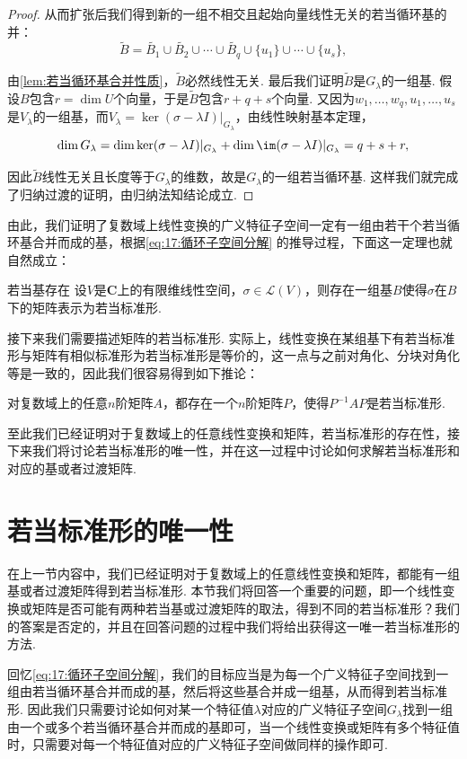 \begin{proof}
    从而扩张后我们得到新的一组不相交且起始向量线性无关的若当循环基的并：
    \[\tilde{B}=\tilde{B_1}\cup\tilde{B_2}\cup\cdots\cup\tilde{B_q}\cup\{u_1\}\cup\cdots\cup\{u_s\},\]

    由\autoref{lem:若当循环基合并性质}，$\tilde{B}$必然线性无关. 最后我们证明$\tilde{B}$是$G_\lambda$的一组基. 假设$B$包含$r=\dim U$个向量，于是$\tilde{B}$包含$r+q+s$个向量. 又因为$w_1,\ldots,w_q,u_1,\ldots,u_s$是$V_\lambda$的一组基，而$V_\lambda=\ker(\sigma-\lambda I)\vert_{G_\lambda}$，由线性映射基本定理，
    \[\dim G_\lambda=\dim\ker(\sigma-\lambda I)\vert_{G_\lambda}+\dim\im(\sigma-\lambda I)\vert_{G_\lambda}=q+s+r,\]

    因此$\tilde{B}$线性无关且长度等于$G_\lambda$的维数，故是$G_\lambda$的一组若当循环基. 这样我们就完成了归纳过渡的证明，由归纳法知结论成立.
\end{proof}

由此，我们证明了复数域上线性变换的广义特征子空间一定有一组由若干个若当循环基合并而成的基，根据\autoref{eq:17:循环子空间分解} 的推导过程，下面这一定理也就自然成立：
\begin{corollary}{}{若当基存在}
    设$V$是$\mathbf{C}$上的有限维线性空间，$\sigma\in\mathcal{L}(V)$，则存在一组基$B$使得$\sigma$在$B$下的矩阵表示为若当标准形.
\end{corollary}

接下来我们需要描述矩阵的若当标准形. 实际上，线性变换在某组基下有若当标准形与矩阵有相似标准形为若当标准形是等价的，这一点与之前对角化、分块对角化等是一致的，因此我们很容易得到如下推论：
\begin{corollary}{}{}
    对复数域上的任意$n$阶矩阵$A$，都存在一个$n$阶矩阵$P$，使得$P^{-1}AP$是若当标准形.
\end{corollary}

至此我们已经证明对于复数域上的任意线性变换和矩阵，若当标准形的存在性，接下来我们将讨论若当标准形的唯一性，并在这一过程中讨论如何求解若当标准形和对应的基或者过渡矩阵.

\section{若当标准形的唯一性}

在上一节内容中，我们已经证明对于复数域上的任意线性变换和矩阵，都能有一组基或者过渡矩阵得到若当标准形. 本节我们将回答一个重要的问题，即一个线性变换或矩阵是否可能有两种若当基或过渡矩阵的取法，得到不同的若当标准形？我们的答案是否定的，并且在回答问题的过程中我们将给出获得这一唯一若当标准形的方法.

回忆\autoref{eq:17:循环子空间分解}，我们的目标应当是为每一个广义特征子空间找到一组由若当循环基合并而成的基，然后将这些基合并成一组基，从而得到若当标准形. 因此我们只需要讨论如何对某一个特征值$\lambda$对应的广义特征子空间$G_\lambda$找到一组由一个或多个若当循环基合并而成的基即可，当一个线性变换或矩阵有多个特征值时，只需要对每一个特征值对应的广义特征子空间做同样的操作即可.

